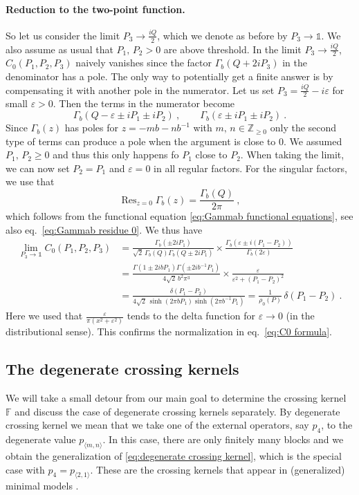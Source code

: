 \documentclass[12pt,a4paper]{article}
\newcommand{\be}{\begin{equation}}
\newcommand{\ee}{\end{equation}}
\newcommand\ZZ{\mathbb{Z}}
\newcommand\id{\mathds{1}}
\DeclareMathOperator*{\Res}{Res}
\begin{document}
\paragraph{Reduction to the two-point function.} So let us consider the limit $P_3 \to \frac{iQ}{2}$, which we denote as before by $P_3 \to \id$. We also assume as usual that $P_1,\, P_2>0$ are above threshold. In the limit $P_3 \to \frac{iQ}{2}$, $C_0(P_1,P_2,P_3)$ naively vanishes since the factor $\Gamma_b(Q+2i P_3)$ in the denominator has a pole. The only way to potentially get a finite answer is by compensating it with another pole in the numerator. Let us set $P_3=\frac{iQ}{2}-i \varepsilon$ for small $\varepsilon>0$. Then the terms in the numerator become
\be 
\Gamma_b(Q-\varepsilon \pm i P_1 \pm i P_2)\ , \qquad \Gamma_b(\varepsilon \pm i P_1 \pm i P_2)\ .
\ee
Since $\Gamma_b(z)$ has poles for $z=-mb-n b^{-1}$ with $m,\, n \in \ZZ_{\ge 0}$ only the second type of terms can produce a pole when the argument is close to 0. We assumed $P_1,\, P_2 \ge 0$ and thus this only happens fo $P_1$ close to $P_2$. 
When taking the limit, we can now set $P_2=P_1$ and $\varepsilon=0$ in all regular factors. For the singular factors, we use that
\be 
\Res_{z=0} \Gamma_b(z)=\frac{\Gamma_b(Q)}{2\pi}\ ,
\ee
which follows from the functional equation \eqref{eq:Gammab functional equations}, see also eq.~\eqref{eq:Gammab residue 0}. We thus have
\begin{align}
    \lim_{P_3 \to \id} C_0(P_1,P_2,P_3)&=\frac{\Gamma_b(\pm 2i P_1)}{\sqrt{2}\, \Gamma_b(Q) \Gamma_b(Q \pm 2i P_1)} \times \frac{\Gamma_b(\varepsilon \pm i (P_1-P_2))}{\Gamma_b(2 \varepsilon)} \\
    &=\frac{\Gamma(1 \pm 2i b P_1)\Gamma(\pm 2i b^{-1} P_1)}{4\sqrt{2}\, b^2\pi^3}\times  \frac{\varepsilon}{\varepsilon^2+(P_1-P_2)^2} \\
    &=\frac{\delta(P_1-P_2)}{4\sqrt{2}\, \sinh(2\pi b P_1) \sinh(2\pi b^{-1} P_1)}=\frac{1}{\rho_0(P)}\, \delta(P_1-P_2)\ .
\end{align}
Here we used that $\frac{\varepsilon}{\pi(x^2+\varepsilon^2)}$ tends to the delta function for $\varepsilon \to 0$ (in the distributional sense). This confirms the normalization in eq.~\eqref{eq:C0 formula}.

\subsection{The degenerate crossing kernels}
We will take a small detour from our main goal to determine the crossing kernel $\mathbb{F}$ and discuss the case of degenerate crossing kernels separately. 
By degenerate crossing kernel we mean that we take one of the external operators, say $p_4$, to the degenerate value $p_{\langle m,n \rangle}$. In this case, there are only finitely many blocks and we obtain the generalization of \eqref{eq:degenerate crossing kernel}, which is the special case with $p_4=p_{\langle 2,1 \rangle}$.
These are the crossing kernels that appear in (generalized) minimal models \cite{Zamolodchikov:2005fy}.
\end{document}
